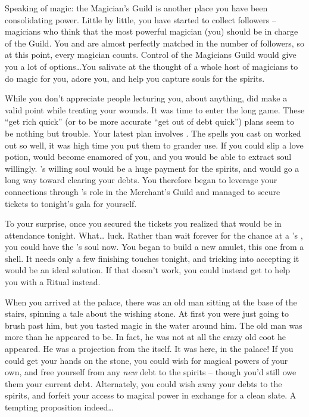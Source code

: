 \documentclass[char]{NeptuneBall}
\begin{document}
Speaking of magic: the Magician's Guild is another place you have been consolidating power. Little by little, you have started to collect followers -- magicians who think that the most powerful magician (you) should be in charge of the Guild. You and \cManta{} are almost perfectly matched in the number of followers, so at this point, every magician counts. Control of the Magicians Guild would give you a lot of options\ldots You salivate at the thought of a whole host of magicians to do magic for you, adore you, and help you capture souls for the spirits.

While you don't appreciate people lecturing you, about anything, \cManta{} did make a valid point while \cManta{\they} \cManta{\were} treating your wounds. It was time to enter the long game. These ``get rich quick'' (or to be more accurate ``get out of debt quick'') plans seem to be nothing but trouble. Your latest plan involves \cKing{\King} \cKing{}. The spells you cast on \cSlave{\MYname} worked out so well, it was high time you put them to grander use. If you could slip \cKing{} a love potion, \cKing{} would become enamored of you, and you would be able to extract \cKing{\their} soul willingly. \cKing{}'s willing soul would be a huge payment for the spirits, and would go a long way toward clearing your debts. You therefore began to leverage your connections through \cSlave{\MYname}'s role in the Merchant's Guild and managed to secure tickets to tonight's gala for yourself.

To your surprise, once you secured the tickets you realized that \cAriel{\King} \cAriel{} would be in attendance tonight. What\ldots{} luck. Rather than wait forever for the chance at a \cAriel{}'s \cArielsSon{\offspring}, you could have the \cAriel{\parent}'s soul now. You began to build a new amulet, this one from a shell. It needs only a few finishing touches tonight, and tricking \cAriel{\them} into accepting it would be an ideal solution. If that doesn't work, you could instead get \cAriel{\them} to help you with a \gRitual{} Ritual instead.

When you arrived at the palace, there was an old man sitting at the base of the stairs, spinning a tale about the wishing stone. At first you were just going to brush past him, but you tasted magic in the water around him. The old man was more than he appeared to be. In fact, he was not at all the crazy old coot he appeared. He was a projection from the \iWishingStone{\MYname} itself. It was here, in the palace! If you could get your hands on the stone, you could wish for magical powers of your own, and free yourself from any \emph{new} debt to the spirits -- though you'd still owe them your current debt. Alternately, you could wish away your debts to the spirits, and forfeit your access to magical power in exchange for a clean slate. A tempting proposition indeed\ldots{}
\end{document}
